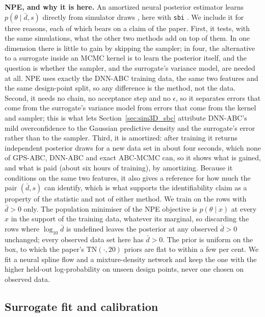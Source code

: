 \documentclass[sn-basic,iicol,pdflatex]{sn-jnl}
\begin{document}
\noindent\textbf{NPE, and why it is here.} An amortized neural posterior estimator
learns $p(\theta\mid\bar d,s)$ directly from simulator draws
\citep{papamakarios2016,greenberg2019}, here with \texttt{sbi}
\citep{tejerocantero2020}. We include it for three reasons, each of which bears on a claim of the paper. First, it
tests, with the same simulations, what the other two methods add on top of them. In one
dimension there is little to gain by skipping the sampler; in four, the
alternative to a surrogate inside an MCMC kernel is to learn the posterior
itself, and the question is whether the sampler, and the surrogate's variance
model, are needed at all. NPE uses exactly the DNN-ABC training data, the same
two features and the same design-point split, so any difference is the
method, not the data. Second, it needs no chain, no acceptance step and no $\epsilon$, so it
separates errors that come from the surrogate's variance model from errors that
come from the kernel and sampler; this is what lets Section~\ref{sec:sim3D_sbc} attribute
DNN-ABC's mild overconfidence to the Gaussian predictive density and the surrogate's
error rather than to the sampler. Third, it is amortized: after training it returns
independent posterior draws for a new data set in about four seconds, which none of GPS-ABC,
DNN-ABC and exact ABC-MCMC can, so it shows what is gained, and what is paid
(about six hours of training), by amortizing. Because it conditions on the same two
features, it also gives a reference for how much the pair $(\bar d,s)$ can identify, which
is what supports the identifiability claim as a property of the statistic and not of either method. We
train on the rows with $\bar d>0$ only. The population minimiser of the NPE
objective is $p(\theta\mid x)$ at every $x$ in the support of the training data,
whatever its marginal, so discarding the rows where $\log_{10}\bar d$ is undefined
leaves the posterior at any observed $\bar d>0$ unchanged; every observed data set
here has $\bar d>0$. The prior is uniform on the box, to which the paper's
$\mathrm{TN}(\cdot,20)$ priors are flat to within a few per cent. We fit a
neural spline flow and a mixture-density network and keep the one with the higher
held-out log-probability on unseen design points, never one chosen on observed data.

\subsection{Surrogate fit and calibration}
\label{sec:sim3D_fit}
\end{document}
